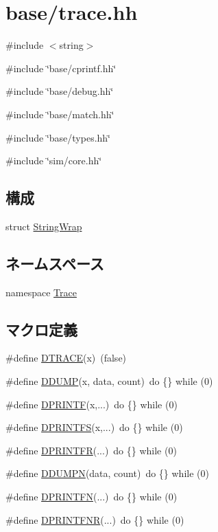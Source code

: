\hypertarget{trace_8hh}{
\section{base/trace.hh}
\label{trace_8hh}
}
{\ttfamily \#include $<$string$>$}\par
{\ttfamily \#include \char`\"{}base/cprintf.hh\char`\"{}}\par
{\ttfamily \#include \char`\"{}base/debug.hh\char`\"{}}\par
{\ttfamily \#include \char`\"{}base/match.hh\char`\"{}}\par
{\ttfamily \#include \char`\"{}base/types.hh\char`\"{}}\par
{\ttfamily \#include \char`\"{}sim/core.hh\char`\"{}}\par
\subsection*{構成}
\begin{DoxyCompactItemize}
\item 
struct \hyperlink{structStringWrap}{StringWrap}
\end{DoxyCompactItemize}
\subsection*{ネームスペース}
\begin{DoxyCompactItemize}
\item 
namespace \hyperlink{namespaceTrace}{Trace}
\end{DoxyCompactItemize}
\subsection*{マクロ定義}
\begin{DoxyCompactItemize}
\item 
\#define \hyperlink{trace_8hh_af76c9f7776aade1bf9d7dfa8a0c6b341}{DTRACE}(x)~(false)
\item 
\#define \hyperlink{trace_8hh_a556faf39d3fa9f7db5f344487ddbb397}{DDUMP}(x, data, count)~do \{\} while (0)
\item 
\#define \hyperlink{trace_8hh_aefe58fddf89e41edd783bf4c3e31d2c3}{DPRINTF}(x,...)~do \{\} while (0)
\item 
\#define \hyperlink{trace_8hh_af996ff4711b7ddc2a809a9a8ef54c24c}{DPRINTFS}(x,...)~do \{\} while (0)
\item 
\#define \hyperlink{trace_8hh_ab50e5d70719a2562fe32d994959ad324}{DPRINTFR}(...)~do \{\} while (0)
\item 
\#define \hyperlink{trace_8hh_aaab1bd1f895c0de5043ebfba35d1aba4}{DDUMPN}(data, count)~do \{\} while (0)
\item 
\#define \hyperlink{trace_8hh_a8743588cbe0ed2266fabe1090b16da34}{DPRINTFN}(...)~do \{\} while (0)
\item 
\#define \hyperlink{trace_8hh_a9816941b3ff98b600ebcf1fdbd69422c}{DPRINTFNR}(...)~do \{\} while (0)
\end{DoxyCompactItemize}

